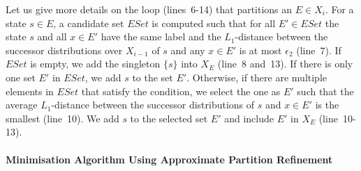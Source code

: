 \documentclass[a4paper,UKenglish,cleveref,autoref,thm-restate]{lipics-v2021}
\begin{document}
Let us give more details on the loop (lines~6-14) that partitions an $E \in X_i$.
For a state $s \in E$, a candidate set $\mathit{ESet}$ is computed such that for all $E' \in \mathit{ESet}$ the state $s$ and all $x \in E'$ have the same label and the $L_1$-distance between the successor distributions over $X_{i-1}$ of $s$ and any $x \in E'$ is at most $\epsilon_2$ (line~7). If $\mathit{ESet}$ is empty, we add the singleton $\{s\}$ into $X_E$ (line~8 and~13). If there is only one set $E'$ in $\mathit{ESet}$, we add $s$ to the set $E'$. Otherwise, if there are multiple elements in $\mathit{ESet}$ that satisfy the condition, we select the one as $E'$ such that the average $L_1$-distance between the successor distributions of $s$ and $x \in E'$ is the smallest (line~10). We add $s$ to the selected set $E'$ and include $E'$ in $X_{E}$ (line~10-13).




\paragraph*{Minimisation Algorithm Using Approximate Partition Refinement}
\end{document}

